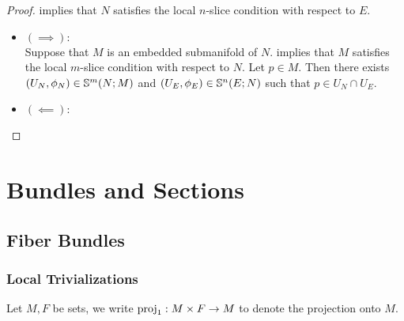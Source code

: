 \documentclass{book}
\begin{document}
	\begin{proof} implies that $N$ satisfies the local $n$-slice condition with respect to $E$.
		\begin{itemize}
			\item $(\implies):$ \\
			Suppose that $M$ is an embedded submanifold of $N$.  implies that $M$ satisfies the local $m$-slice condition with respect to $N$. Let $p \in M$. Then there exists $(U_N, \phi_N) \in \S^m(N; M)$ and $(U_E, \phi_E) \in \S^n(E;N)$ such that $p \in U_N \cap U_E$. 
			\item $(\impliedby):$ \\
			
		\end{itemize}
	\end{proof}
	
	
	
	
	
	
	
	
	
	
	
	
	
	
	
	
	
	
	
	
	
	
	
	
	
	
	
	
	
	
	
	
	
	
	
	
	
	
	
	
	
	
	
	
	
	\newpage
	\chapter{Bundles and Sections}
	
	\section{Fiber Bundles}
	
	\subsection{Local Trivializations}
	
	\begin{note} 
		Let $M, F$ be sets, we write $\prj_1: M \times F \rightarrow M$ to denote the projection onto $M$.
	\end{note}
\end{document}
